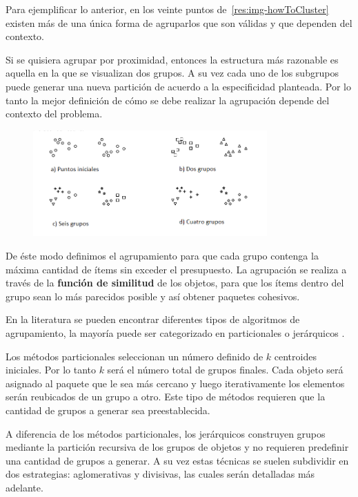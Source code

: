 Para ejemplificar lo anterior, en los veinte puntos de~\autoref{res:img-howToCluster} existen más de una única forma de agruparlos que son válidas y que dependen del contexto. 

Si se quisiera agrupar por proximidad, entonces la estructura más razonable es aquella en la que se visualizan dos grupos. A su vez cada uno de los subgrupos puede generar una nueva partición de acuerdo a la especificidad planteada. Por lo tanto la mejor definición de cómo se debe realizar la agrupación depende del contexto del problema.

\begin{figure}[H]
  \centering
   \includegraphics[width=0.8\textwidth]{img/howToCluster.png}
   \caption{}
   \label{res:img-howToCluster}
\end{figure}

De éste modo definimos el agrupamiento para que cada grupo contenga la máxima cantidad de ítems sin exceder el presupuesto. La agrupación se realiza a través de la \textbf{función de similitud} de los objetos, para que los ítems dentro del grupo sean lo más parecidos posible y así obtener paquetes cohesivos.

En la literatura se pueden encontrar diferentes tipos de algoritmos de agrupamiento, la mayoría puede ser categorizado en particionales o jerárquicos \cite{opac-b1087461}. 

Los métodos particionales seleccionan un número definido de $k$ centroides iniciales. Por lo tanto $k$ será el número total de grupos finales. Cada objeto será asignado al paquete que le sea más cercano y luego iterativamente los elementos serán reubicados de un grupo a otro. Este tipo de métodos requieren que la cantidad de grupos a generar sea preestablecida. 

A diferencia de los métodos particionales, los jerárquicos construyen grupos mediante la partición recursiva de los grupos de objetos y no requieren predefinir una cantidad de grupos a generar. A su vez estas técnicas se suelen subdividir en dos estrategias: aglomerativas y divisivas, las cuales serán detalladas más adelante.


